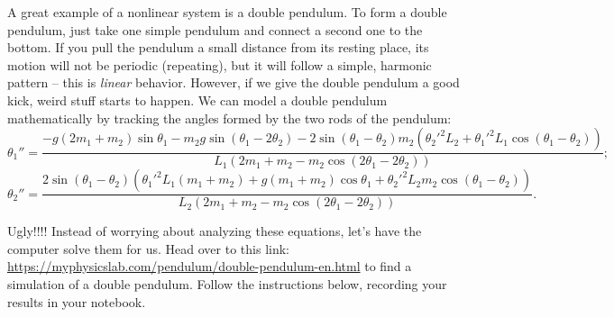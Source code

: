 \documentclass[11pt]{article}
\begin{document}
\medskip \noindent
A great example of a nonlinear system is a double pendulum. To form a double pendulum, just take one simple pendulum and connect a second one to the bottom. If you pull the pendulum a small distance from its resting place, its motion will not be periodic (repeating), but it will follow a simple, harmonic pattern -- this is \textit{linear} behavior. However, if we give the double pendulum a good kick, weird stuff starts to happen. We can model a double pendulum mathematically by tracking the angles formed by the two rods of the pendulum:
\begin{equation} \label{eq:theta1}
    \theta_1'' = \frac{-g(2m_1 + m_2)\sin\theta_1 - m_2 g \sin(\theta_1-2\theta_2) - 2\sin(\theta_1-\theta_2)m_2(\theta_2'^2 L_2 + \theta_1'^2 L_1 \cos(\theta_1-\theta_2))}{L_1 (2m_1 + m_2 - m_2\cos(2\theta_1-2\theta_2))};
\end{equation}
\begin{equation} \label{eq:theta2}
    \theta_2'' = \frac{2\sin(\theta_1-\theta_2)(\theta_1'^2 L_1(m_1 + m_2) + g(m_1 + m_2)\cos\theta_1 + \theta_2'^2 L_2 m_2 \cos(\theta_1-\theta_2))}{L_2(2m_1 + m_2 - m_2\cos(2\theta_1 - 2\theta_2))}.
\end{equation}

\medskip \noindent
Ugly!!!! Instead of worrying about analyzing these equations, let's have the computer solve them for us. Head over to this link: \url{https://myphysicslab.com/pendulum/double-pendulum-en.html} to find a simulation of a double pendulum. Follow the instructions below, recording your results in your notebook.
\end{document}
